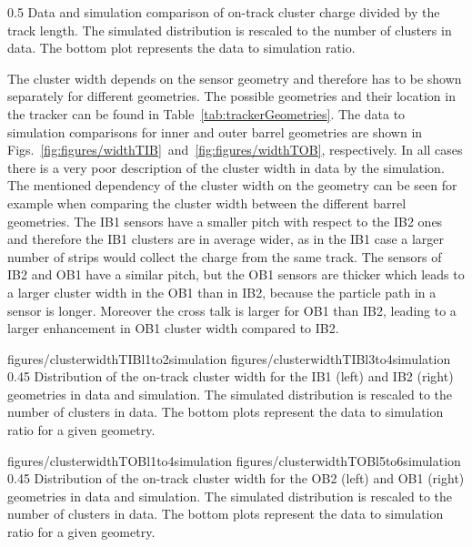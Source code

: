                  {0.5}       %
                 { Data and simulation comparison of on-track cluster charge divided by the track length. The simulated distribution is rescaled to the number of clusters in data. The bottom plot represents the data to simulation ratio. }

The cluster width depends on the sensor geometry and therefore has to be shown separately for different geometries. The possible geometries and their location in the tracker can be found in Table~\ref{tab:trackerGeometries}. The data to simulation comparisons for inner and outer barrel geometries are shown in Figs.~\ref{fig:figures/widthTIB}~and~\ref{fig:figures/widthTOB}, respectively. In all cases there is a very poor description of the cluster width in data by the simulation. The mentioned dependency of the cluster width on the geometry can be seen for example when comparing the cluster width between the different barrel geometries. The IB1 sensors have a smaller pitch with respect to the IB2 ones and therefore the IB1 clusters are in average wider, as in the IB1 case a larger number of strips would collect the charge from the same track. The sensors of IB2 and OB1 have a similar pitch, but the OB1 sensors are thicker which leads to a larger cluster width in the OB1 than in IB2, because the particle path in a sensor is longer. Moreover the cross talk is larger for OB1 than IB2, leading to a larger enhancement in OB1 cluster width compared to IB2.


                 {figures/clusterwidthTIBl1to2simulation}
                 {figures/clusterwidthTIBl3to4simulation} %
                 {0.45}       %
                 { Distribution of the on-track cluster width for the IB1 (left) and IB2 (right) geometries in data and simulation. The simulated distribution is rescaled to the number of clusters in data. The bottom plots represent the data to simulation ratio for a given geometry. }

                 {figures/clusterwidthTOBl1to4simulation}
                 {figures/clusterwidthTOBl5to6simulation} %
                 {0.45}       %
                 { Distribution of the on-track cluster width for the OB2 (left) and OB1 (right) geometries in data and simulation. The simulated distribution is rescaled to the number of clusters in data. The bottom plots represent the data to simulation ratio for a given geometry. }


